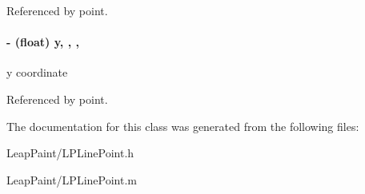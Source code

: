 Referenced by point.

\hypertarget{interface_l_p_line_point_ad03af34f7646b5e17a9d5a70a82ce36e}{
\paragraph[{y}]{\setlength{\rightskip}{0pt plus 5cm}-\/ (float) y\hspace{0.3cm}{\ttfamily [read]}, {\ttfamily [write]}, {\ttfamily [nonatomic]}, {\ttfamily [assign]}}}\label{d6/dab/interface_l_p_line_point_ad03af34f7646b5e17a9d5a70a82ce36e}
y coordinate 

Referenced by point.



The documentation for this class was generated from the following files\-:\begin{DoxyCompactItemize}
\item 
Leap\-Paint/L\-P\-Line\-Point.\-h\item 
Leap\-Paint/L\-P\-Line\-Point.\-m\end{DoxyCompactItemize}
